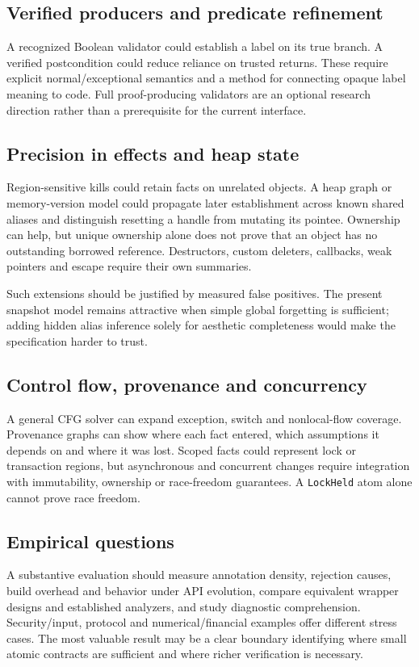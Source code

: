 \documentclass[11pt]{article}
\begin{document}
\subsection{Verified producers and predicate refinement}
A recognized Boolean validator could establish a label on its true branch.
A verified postcondition could reduce reliance on trusted returns. These
require explicit normal/exceptional semantics and a method for connecting
opaque label meaning to code. Full proof-producing validators are an optional
research direction rather than a prerequisite for the current interface.

\subsection{Precision in effects and heap state}
Region-sensitive kills could retain facts on unrelated objects. A heap graph
or memory-version model could propagate later establishment across known
shared aliases and distinguish resetting a handle from mutating its pointee.
Ownership can help, but unique ownership alone does not prove that an object
has no outstanding borrowed reference. Destructors, custom deleters, callbacks,
weak pointers and escape require their own summaries.

Such extensions should be justified by measured false positives. The present
snapshot model remains attractive when simple global forgetting is sufficient;
adding hidden alias inference solely for aesthetic completeness would make
the specification harder to trust.

\subsection{Control flow, provenance and concurrency}
A general CFG solver can expand exception, switch and nonlocal-flow coverage.
Provenance graphs can show where each fact entered, which assumptions it
depends on and where it was lost. Scoped facts could represent lock or
transaction regions, but asynchronous and concurrent changes require integration
with immutability, ownership or race-freedom guarantees. A \texttt{LockHeld}
atom alone cannot prove race freedom.

\subsection{Empirical questions}
A substantive evaluation should measure annotation density, rejection causes,
build overhead and behavior under API evolution, compare equivalent wrapper
designs and established analyzers, and study diagnostic comprehension.
Security/input, protocol and numerical/financial examples offer different
stress cases. The most valuable result may be a clear boundary identifying
where small atomic contracts are sufficient and where richer verification
is necessary.
\end{document}
